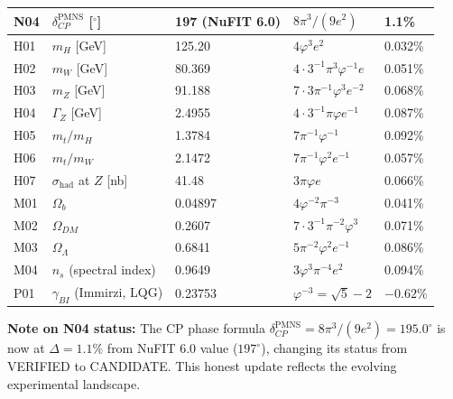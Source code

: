 \documentclass[10pt,a4paper]{article}
\begin{document}
\begin{longtable}{@{}lllll@{}}
N04 & $\delta_{CP}^{\text{PMNS}}$ [$^\circ$] & 197 (NuFIT 6.0) & $8\pi^3/(9e^2)$ & \textbf{1.1\%} \\
\midrule
H01 & $m_H$ [GeV]                          & 125.20   & $4\varphi^3 e^2$                                   & 0.032\% \\
H02 & $m_W$ [GeV]                          & 80.369   & $4{\cdot}3^{-1}\pi^3\varphi^{-1}e$                 & 0.051\% \\
H03 & $m_Z$ [GeV]                          & 91.188   & $7{\cdot}3\pi^{-1}\varphi^3 e^{-2}$                & 0.068\% \\
H04 & $\Gamma_Z$ [GeV]                     & 2.4955   & $4{\cdot}3^{-1}\pi\varphi e^{-1}$                  & 0.087\% \\
H05 & $m_t/m_H$                            & 1.3784   & $7\pi^{-1}\varphi^{-1}$                            & 0.092\% \\
H06 & $m_t/m_W$                            & 2.1472   & $7\pi^{-1}\varphi^2 e^{-1}$                        & 0.057\% \\
H07 & $\sigma_{\mathrm{had}}$ at $Z$ [nb]  & 41.48    & $3\pi\varphi e$                                    & 0.066\% \\
\midrule
M01 & $\Omega_b$                           & 0.04897  & $4\varphi^{-2}\pi^{-3}$                            & 0.041\% \\
M02 & $\Omega_{DM}$                        & 0.2607   & $7{\cdot}3^{-1}\pi^{-2}\varphi^3$                  & 0.071\% \\
M03 & $\Omega_\Lambda$                     & 0.6841   & $5\pi^{-2}\varphi^2 e^{-1}$                        & 0.086\% \\
M04 & $n_s$ (spectral index)               & 0.9649   & $3\varphi^3\pi^{-4}e^2$                            & 0.094\% \\
\midrule
P01 & $\gamma_{BI}$ (Immirzi, LQG)         & 0.23753  & $\varphi^{-3} = \sqrt{5}-2$                        & $-0.62\%$ \\
\end{longtable}

\textbf{Note on N04 status:} The CP phase formula $\delta_{CP}^{\text{PMNS}} = 8\pi^3/(9e^2) = 195.0^\circ$
is now at $\Delta = 1.1\%$ from NuFIT 6.0 value ($197^\circ$), changing its status from
VERIFIED to CANDIDATE. This honest update reflects the evolving experimental landscape.

\medskip
\end{document}
